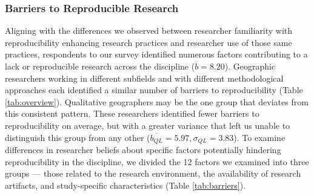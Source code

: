 \documentclass[]{interact}
\theoremstyle{plain}%
\theoremstyle{definition}
\theoremstyle{remark}
\begin{document}
\subsubsection*{Barriers to Reproducible Research}
Aligning with the differences we observed between researcher familiarity with reproducibility enhancing research practices and researcher use of those same practices, respondents to our survey identified numerous factors contributing to a lack or reproducible research across the discipline ($\overline{b}=8.20$). 
Geographic researchers working in different subfields and with different methodological approaches each identified a similar number of barriers to reproducibility (Table \ref{tab:overview}).
Qualitative geographers may be the one group that deviates from this consistent pattern. 
These researchers identified fewer barriers to reproducibility on average, but with a greater variance that left us unable to distinguish this group from any other ($\overline{b_{QL}}=5.97, \sigma_{QL}=3.83$).
To examine differences in researcher beliefs about specific factors potentially hindering reproducibility in the discipline, we divided the 12 factors we examined into three groups --- those related to the research environment, the availability of research artifacts, and study-specific characteristics (Table \ref{tab:barriers}). 
\end{document}
